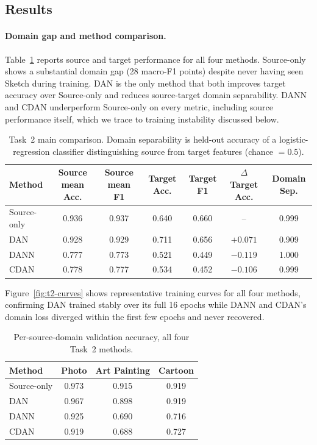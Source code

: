 \documentclass{article}
\begin{document}
\subsection{Results}

\paragraph{Domain gap and method comparison.}
Table~\ref{tab:t2-main} reports source and target performance for all four methods. Source-only shows a substantial domain gap (28 macro-F1 points) despite never having seen Sketch during training. DAN is the only method that both improves target accuracy over Source-only and reduces source-target domain separability. DANN and CDAN underperform Source-only on every metric, including source performance itself, which we trace to training instability discussed below.

\begin{table}[t]
  \caption{Task~2 main comparison. Domain separability is held-out accuracy of a logistic-regression classifier distinguishing source from target features (chance $=0.5$).}
  \label{tab:t2-main}
  \centering
  \footnotesize
  \begin{tabular}{lcccccc}
    \toprule
    Method & Source mean Acc. & Source mean F1 & Target Acc. & Target F1 & $\Delta$ Target Acc. & Domain Sep. \\
    \midrule
    Source-only & 0.936 & 0.937 & 0.640 & 0.660 & --      & 0.999 \\
    DAN         & 0.928 & 0.929 & 0.711 & 0.656 & $+0.071$ & 0.909 \\
    DANN        & 0.777 & 0.773 & 0.521 & 0.449 & $-0.119$ & 1.000 \\
    CDAN        & 0.778 & 0.777 & 0.534 & 0.452 & $-0.106$ & 0.999 \\
    \bottomrule
  \end{tabular}
\end{table}

Figure~\ref{fig:t2-curves} shows representative training curves for all four methods, confirming DAN trained stably over its full 16 epochs while DANN and CDAN's domain loss diverged within the first few epochs and never recovered.

\begin{table}[t]
  \caption{Per-source-domain validation accuracy, all four Task~2 methods.}
  \label{tab:t2-perdomain}
  \centering
  \footnotesize
  \begin{tabular}{lccc}
    \toprule
    Method & Photo & Art Painting & Cartoon \\
    \midrule
    Source-only & 0.973 & 0.915 & 0.919 \\
    DAN         & 0.967 & 0.898 & 0.919 \\
    DANN        & 0.925 & 0.690 & 0.716 \\
    CDAN        & 0.919 & 0.688 & 0.727 \\
    \bottomrule
  \end{tabular}
\end{table}
\end{document}
